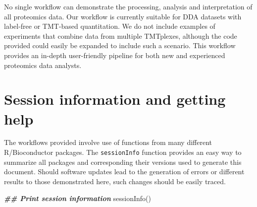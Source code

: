 \documentclass[9pt,a4paper,]{extarticle}
\newenvironment{Shaded}{\begin{snugshade}}{\end{snugshade}}
\newcommand{\DocumentationTok}[1]{\textcolor[rgb]{0.56,0.35,0.01}{\textbf{\textit{#1}}}}
\newcommand{\FunctionTok}[1]{\textcolor[rgb]{0.00,0.00,0.00}{#1}}
\newcommand{\NormalTok}[1]{#1}
\begin{document}
No single workflow can demonstrate the processing, analysis and interpretation
of all proteomics data. Our workflow is currently suitable for DDA datasets with
label-free or TMT-based quantitation. We do not include examples of experiments
that combine data from multiple TMTplexes, although the code provided could
easily be expanded to include such a scenario. This workflow provides an in-depth
user-friendly pipeline for both new and experienced proteomics data analysts.

\hypertarget{session-information-and-getting-help}{%
\section{Session information and getting help}\label{session-information-and-getting-help}}

The workflows provided involve use of functions from many different
R/Bioconductor packages. The \texttt{sessionInfo} function provides an easy way to
summarize all packages and corresponding their versions used to generate this
document. Should software updates lead to the generation of errors or different
results to those demonstrated here, such changes should be easily traced.

\begin{Shaded}
\begin{Highlighting}[]
\DocumentationTok{\#\# Print session information}
\FunctionTok{sessionInfo}\NormalTok{()}
\end{Highlighting}
\end{Shaded}
\end{document}
